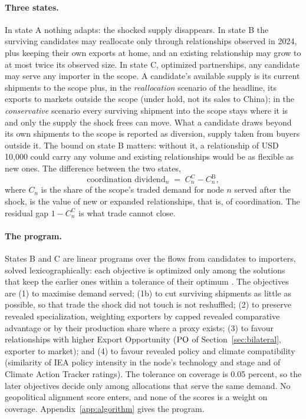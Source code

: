 \paragraph{Three states.} In state A nothing adapts: the shocked supply disappears. In state B the
surviving candidates may reallocate only through relationships observed in 2024, plus keeping their
own exports at home, and an existing relationship may grow to at most twice its observed size. In
state C, optimized partnerships, any candidate may serve any importer in the scope. A candidate's
available supply is its current shipments to the scope plus, in the \emph{reallocation} scenario of
the headline, its exports to markets outside the scope (under hold, not its sales to China); in the
\emph{conservative} scenario every surviving shipment into the scope stays where it is and only the
supply the shock frees can move. What a candidate draws beyond its own shipments to the scope is
reported as diversion, supply taken from buyers outside it. The bound on state B matters: without
it, a relationship of USD 10{,}000 could carry any volume and existing relationships would be as
flexible as new ones. The difference between the two states,
\begin{equation}\label{eq:aib_dividend}
  \text{coordination dividend}_n \;=\; C^{\mathrm C}_n - C^{\mathrm B}_n ,
\end{equation}
where $C_n$ is the share of the scope's traded demand for node $n$ served after the shock, is the
value of new or expanded relationships, that is, of coordination. The residual gap
$1-C^{\mathrm C}_n$ is what trade cannot close.

\paragraph{The program.} States B and C are linear programs over the flows from candidates to
importers, solved lexicographically: each objective is optimized only among the solutions that keep
the earlier ones within a tolerance of their optimum \citep{ehrgott2005multicriteria,makhorin2020glpk}.
The objectives are (1) to maximise demand served; (1b) to cut surviving shipments as little as
possible, so that trade the shock did not touch is not reshuffled; (2) to preserve revealed
specialization, weighting exporters by capped revealed comparative advantage
\citep{balassa1965trade} or by their production share where a proxy exists; (3) to favour
relationships with higher Export Opportunity ($\mathrm{PO}$ of Section~\ref{sec:bilateral}, exporter to
market); and (4) to favour revealed policy and climate compatibility (similarity of IEA policy
intensity in the node's technology and stage and of Climate Action Tracker ratings). The tolerance on
coverage is 0.05 percent, so the later objectives decide only among allocations that serve the same
demand. No geopolitical alignment score enters, and none of the scores is a weight on coverage.
Appendix~\ref{app:algorithm} gives the program.

